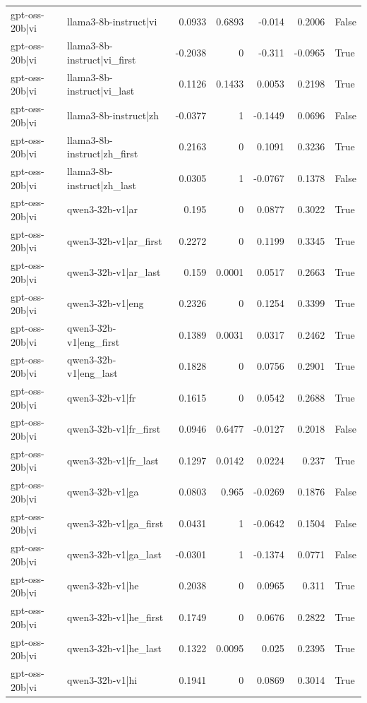\begin{table}
\begin{tabular}{l l r r r r l}
gpt-oss-20b|vi & llama3-8b-instruct|vi & 0.0933 & 0.6893 & -0.014 & 0.2006 & False \\
gpt-oss-20b|vi & llama3-8b-instruct|vi_first & -0.2038 & 0 & -0.311 & -0.0965 & True \\
gpt-oss-20b|vi & llama3-8b-instruct|vi_last & 0.1126 & 0.1433 & 0.0053 & 0.2198 & True \\
gpt-oss-20b|vi & llama3-8b-instruct|zh & -0.0377 & 1 & -0.1449 & 0.0696 & False \\
gpt-oss-20b|vi & llama3-8b-instruct|zh_first & 0.2163 & 0 & 0.1091 & 0.3236 & True \\
gpt-oss-20b|vi & llama3-8b-instruct|zh_last & 0.0305 & 1 & -0.0767 & 0.1378 & False \\
gpt-oss-20b|vi & qwen3-32b-v1|ar & 0.195 & 0 & 0.0877 & 0.3022 & True \\
gpt-oss-20b|vi & qwen3-32b-v1|ar_first & 0.2272 & 0 & 0.1199 & 0.3345 & True \\
gpt-oss-20b|vi & qwen3-32b-v1|ar_last & 0.159 & 0.0001 & 0.0517 & 0.2663 & True \\
gpt-oss-20b|vi & qwen3-32b-v1|eng & 0.2326 & 0 & 0.1254 & 0.3399 & True \\
gpt-oss-20b|vi & qwen3-32b-v1|eng_first & 0.1389 & 0.0031 & 0.0317 & 0.2462 & True \\
gpt-oss-20b|vi & qwen3-32b-v1|eng_last & 0.1828 & 0 & 0.0756 & 0.2901 & True \\
gpt-oss-20b|vi & qwen3-32b-v1|fr & 0.1615 & 0 & 0.0542 & 0.2688 & True \\
gpt-oss-20b|vi & qwen3-32b-v1|fr_first & 0.0946 & 0.6477 & -0.0127 & 0.2018 & False \\
gpt-oss-20b|vi & qwen3-32b-v1|fr_last & 0.1297 & 0.0142 & 0.0224 & 0.237 & True \\
gpt-oss-20b|vi & qwen3-32b-v1|ga & 0.0803 & 0.965 & -0.0269 & 0.1876 & False \\
gpt-oss-20b|vi & qwen3-32b-v1|ga_first & 0.0431 & 1 & -0.0642 & 0.1504 & False \\
gpt-oss-20b|vi & qwen3-32b-v1|ga_last & -0.0301 & 1 & -0.1374 & 0.0771 & False \\
gpt-oss-20b|vi & qwen3-32b-v1|he & 0.2038 & 0 & 0.0965 & 0.311 & True \\
gpt-oss-20b|vi & qwen3-32b-v1|he_first & 0.1749 & 0 & 0.0676 & 0.2822 & True \\
gpt-oss-20b|vi & qwen3-32b-v1|he_last & 0.1322 & 0.0095 & 0.025 & 0.2395 & True \\
gpt-oss-20b|vi & qwen3-32b-v1|hi & 0.1941 & 0 & 0.0869 & 0.3014 & True \\

\end{tabular}
\end{table}
